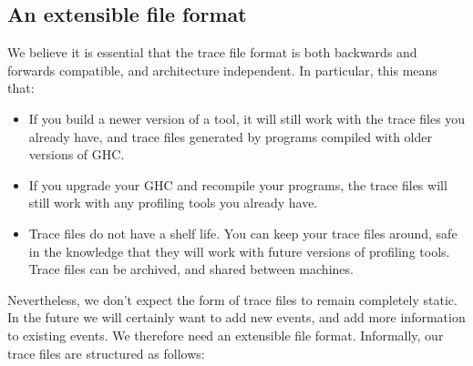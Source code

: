 \documentclass[twocolumn,9pt]{sigplanconf}
\begin{document}
\subsection{An extensible file format}

We believe it is essential that the trace file format is both
backwards and forwards compatible, and architecture independent.  In
particular, this means that:

\begin{itemize}
\item If you build a newer version of a tool, it will still work with
  the trace files you already have, and trace files generated by
  programs compiled with older versions of GHC.

\item If you upgrade your GHC and recompile your programs, the trace
  files will still work with any profiling tools you already have.

\item Trace files do not have a shelf life.  You can keep your trace
  files around, safe in the knowledge that they will work with future
  versions of profiling tools.  Trace files can be archived, and
  shared between machines.
\end{itemize}

Nevertheless, we don't expect the form of trace files to remain
completely static.  In the future we will certainly want to add new
events, and add more information to existing events.  We therefore
need an extensible file format.  Informally, our trace files are
structured as follows:
\end{document}
